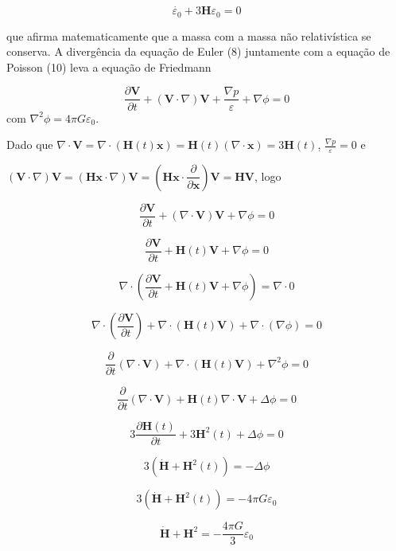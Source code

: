 \documentclass[a4paper,12pt]{article}
\begin{document}
\begin{equation}
	\dot{\varepsilon_0} + 3 \mathbf{H}\varepsilon_0 = 0 
\end{equation}

que afirma matematicamente que a massa com a massa não relativística se conserva. A divergência da equação de Euler (8) juntamente com a equação de Poisson (10) leva a equação de Friedmann 

 $$\dfrac{\partial \textbf{V} }{\partial t} + (\textbf{V} \cdot \nabla ) \textbf{V} + \frac{\nabla p}{\varepsilon} + \nabla \phi =0$$ com $\nabla^2\phi = 4\pi G\varepsilon_0$.

Dado que $\nabla\cdot\mathbf{V} = \nabla \cdot (\mathbf{H}(t)\mathbf{x}) = \mathbf{H}(t) (\nabla\cdot\mathbf{x}) = 3\mathbf{H}(t)$, $\frac{\nabla p}{\varepsilon} = 0$ e

 $(\mathbf{V}\cdot\nabla)\mathbf{V} = (\mathbf{H}\mathbf{x}\cdot\nabla)\mathbf{V}=(\mathbf{H}\mathbf{x}\cdot\dfrac{\partial }{\partial \mathbf{x}})\mathbf{V}= \mathbf{H}\mathbf{V}$, logo


$$\dfrac{\partial \textbf{V} }{\partial t} + ( \nabla\cdot\textbf{V} ) \textbf{V}   + \nabla \phi =0$$

$$\dfrac{\partial \textbf{V} }{\partial t} +\mathbf{H}(t)\mathbf{V}  + \nabla \phi =0$$

 $$\nabla\cdot \left(\dfrac{\partial \textbf{V} }{\partial t} +\mathbf{H}(t)\mathbf{V}  + \nabla \phi \right) =\nabla\cdot0$$
 
$$\nabla\cdot \left(\dfrac{\partial \textbf{V} }{\partial t} \right)+\nabla\cdot \left( \mathbf{H}(t)\mathbf{V} \right)+\nabla\cdot \left(\nabla \phi\right) =0$$

$$ \dfrac{\partial}{\partial t} (\nabla\cdot\textbf{V})  +\nabla\cdot \left( \mathbf{H}(t)\mathbf{V}  \right)+\nabla^2 \phi =0$$	

$$ \dfrac{\partial}{\partial t} (\nabla\cdot\textbf{V})  +\mathbf{H}(t)\nabla\cdot \mathbf{V} +\Delta\phi =0$$

$$ 3\dfrac{\partial\mathbf{H}(t)}{\partial t}  +3\mathbf{H}^2(t) +\Delta\phi =0$$

$$ 3(\dot{\mathbf{H}}  +\mathbf{H}^2(t))  =-\Delta\phi$$

$$ 3(\dot{\mathbf{H}}  +\mathbf{H}^2(t))  =-4\pi G\varepsilon_0$$

\begin{equation}
	\dot{\mathbf{H}} + \mathbf{H}^2 = - \dfrac{4\pi G}{3}\varepsilon_0 
\end{equation}
\end{document}
